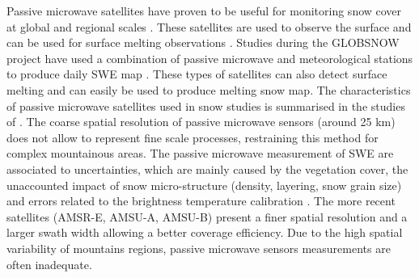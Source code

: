 \documentclass[hydrology,article,submit,moreauthors,pdftex]{Definitions/mdpi}
\begin{document}
Passive microwave satellites have proven to be useful for monitoring snow cover at global and regional scales \citep{Armstrong_1995}. These satellites are used to observe the surface and can be used for surface melting observations \citep{Picard_2006}. Studies during the GLOBSNOW project have used a combination of passive microwave and meteorological stations to produce daily SWE map \citep{Luojus_2014}. These types of satellites can also detect surface melting and can easily be used to produce melting snow map. The characteristics of passive microwave satellites used in snow studies is summarised in the studies of \citet{Konig_2001}. The coarse spatial resolution of passive microwave sensors (around 25 km) does not allow to represent fine scale processes, restraining this method for complex mountainous areas. The passive microwave measurement of SWE are associated to uncertainties, which are mainly caused by the vegetation cover, the unaccounted impact of snow micro-structure (density, layering, snow grain size) and errors related to the brightness temperature calibration \citep{Foster_2005}. The more recent satellites (AMSR-E, AMSU-A, AMSU-B) present a finer spatial resolution and a larger swath width allowing a better coverage efficiency. Due to the high spatial variability of mountains regions, passive microwave sensors measurements are often inadequate. 





\end{document}
